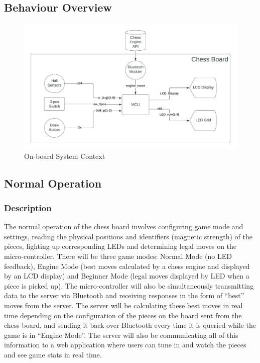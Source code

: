 \documentclass[12pt]{article}
\begin{document}
{\subsection{Behaviour Overview}
\begin{figure}[H]
    \begin{center}
      \includegraphics[scale=0.8]{Hardware_System_Context_Diagram.jpeg}
      \caption{On-board System Context}
      \label{Fig_SystemContext2} 
    \end{center}
  \end{figure}

\subsection{Normal Operation}
\subsubsection{Description}{
    The normal operation of the chess board involves configuring game mode and settings, reading the physical positions and identifiers (magnetic strength) of the pieces, 
    lighting up corresponding LEDs and determining legal moves on the micro-controller. There will be three game modes: Normal Mode (no LED feedback), Engine Mode (best moves 
    calculated by a chess engine and displayed by an LCD display) and Beginner Mode (legal moves displayed by LED when a piece is picked up). The micro-controller will also be 
    simultaneously transmitting data to the server via Bluetooth and receiving responses in the form of ``best'' moves from the server. The server will be calculating these 
    best moves in real time depending on the configuration of the pieces on the board sent from the chess board, and sending it back over Bluetooth every time it is queried
    while the game is in ``Engine Mode''. The server will also be communicating all of this information to a web application where users can tune in and watch the pieces and see
    game stats in real time.
}

}
\end{document}
